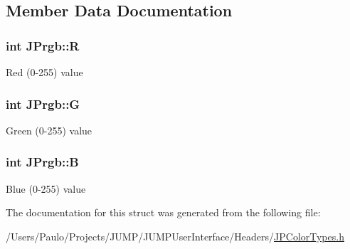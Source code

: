 \subsection{Member Data Documentation}
\hypertarget{struct_j_prgb_a5ce535033f1ffe3f7794c55b60f9b3bb}{
\subsubsection[{R}]{\setlength{\rightskip}{0pt plus 5cm}int {\bf JPrgb::R}}}
\label{struct_j_prgb_a5ce535033f1ffe3f7794c55b60f9b3bb}
Red (0-\/255) value \hypertarget{struct_j_prgb_a3f582322eda3a73be76422ae424f0aa2}{
\subsubsection[{G}]{\setlength{\rightskip}{0pt plus 5cm}int {\bf JPrgb::G}}}
\label{struct_j_prgb_a3f582322eda3a73be76422ae424f0aa2}
Green (0-\/255) value \hypertarget{struct_j_prgb_ae61c8a38e86f875de52e51f5b1326379}{
\subsubsection[{B}]{\setlength{\rightskip}{0pt plus 5cm}int {\bf JPrgb::B}}}
\label{struct_j_prgb_ae61c8a38e86f875de52e51f5b1326379}
Blue (0-\/255) value 

The documentation for this struct was generated from the following file:\begin{DoxyCompactItemize}
\item 
/Users/Paulo/Projects/JUMP/JUMPUserInterface/Headers/\hyperlink{_j_p_color_types_8h}{JPColorTypes.h}\end{DoxyCompactItemize}
